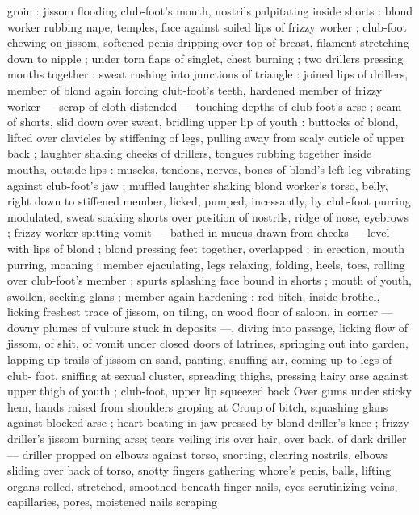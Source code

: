 groin : jissom flooding club-foot's mouth, nostrils palpitating inside
shorts : blond worker rubbing nape, temples, face against soiled lips
of frizzy worker ; club-foot chewing on jissom, softened penis
dripping over top of breast, filament stretching down to nipple ;
under torn flaps of singlet, chest burning ; two drillers pressing
mouths together : sweat rushing into junctions of triangle : joined
lips of drillers, member of blond again forcing club-foot's teeth,
hardened member of frizzy worker --- scrap of cloth distended ---
touching depths of club-foot's arse ; seam of shorts, slid down over
sweat, bridling upper lip of youth : buttocks of blond, lifted over
clavicles by stiffening of legs, pulling away from scaly cuticle of
upper back ; laughter shaking cheeks of drillers, tongues rubbing
together inside mouths, outside lips : muscles, tendons, nerves,
bones of blond’s left leg vibrating against club-foot’s jaw ; muffled
laughter shaking blond worker's torso, belly, right down to stiffened
member, licked, pumped, incessantly, by club-foot purring
modulated, sweat soaking shorts over position of nostrils, ridge of
nose, eyebrows ; frizzy worker spitting vomit --- bathed in mucus
drawn from cheeks --- level with lips of blond ; blond pressing feet
together, overlapped ; in erection, mouth purring, moaning : member
ejaculating, legs relaxing, folding, heels, toes, rolling over club-foot's
member ; spurts splashing face bound in shorts ; mouth of youth,
swollen, seeking glans ; member again hardening : red bitch, inside
brothel, licking freshest trace of jissom, on tiling, on wood floor of
saloon, in corner --- downy plumes of vulture stuck in deposits ---,
diving into passage, licking flow of jissom, of shit, of vomit under
closed doors of latrines, springing out into garden, lapping up trails
of jissom on sand, panting, snuffing air, coming up to legs of club-
foot, sniffing at sexual cluster, spreading thighs, pressing hairy arse
against upper thigh of youth ; club-foot, upper lip squeezed back
Over gums under sticky hem, hands raised from shoulders groping at
Croup of bitch, squashing glans against blocked arse ; heart beating
in jaw pressed by blond driller's knee ; frizzy driller's jissom burning
arse; tears veiling iris over hair, over back, of dark driller --- driller
propped on elbows against torso, snorting, clearing nostrils, elbows
sliding over back of torso, snotty fingers gathering whore's penis,
balls, lifting organs rolled, stretched, smoothed beneath finger-nails,
eyes scrutinizing veins, capillaries, pores, moistened nails scraping

